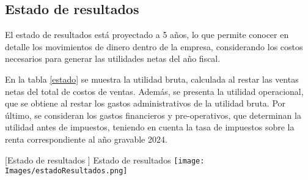 \subsection{Estado de resultados}

El estado de resultados está proyectado a 5 años, lo que permite conocer en detalle los movimientos de dinero dentro de la empresa, considerando los costos necesarios para generar las utilidades netas del año fiscal.

En la tabla \ref{estado} se muestra la utilidad bruta, calculada al restar las ventas netas del total de costos de ventas. Además, se presenta la utilidad operacional, que se obtiene al restar los gastos administrativos de la utilidad bruta. Por último, se consideran los gastos financieros y pre-operativos, que determinan la utilidad antes de impuestos, teniendo en cuenta la tasa de impuestos sobre la renta correspondiente al año gravable 2024.

\vspace{2mm}
\begin{minipage}{0.9\textwidth}
\centering
{}[{Estado de resultados }]{ Estado de resultados }
\label{estado}
\texttt{[image: Images/estadoResultados.png]}
\end{minipage}
\newpage